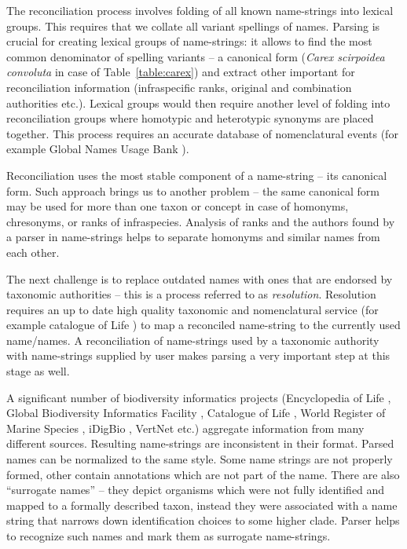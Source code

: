\documentclass{bmcart}
\begin{document}
The reconciliation process involves folding of all known name-strings into
lexical groups. This requires that we collate all variant spellings of names.
Parsing is crucial for creating lexical groups of name-strings: it allows to
find the most common denominator of spelling variants -- a canonical form
(\textit{Carex scirpoidea convoluta} in case of Table~\ref{table:carex}) and
extract other important for reconciliation  information (infraspecific ranks,
original and combination authorities etc.). Lexical groups would then require
another level of folding into reconciliation groups where homotypic and
heterotypic synonyms are placed together. This process requires an accurate
database of nomenclatural events (for example Global Names Usage Bank
\cite{Pyle2003}).

Reconciliation uses the most stable component of a name-string -- its canonical
form. Such approach brings us to another problem -- the same canonical form may
be used for more than one taxon or concept in case of homonyms, chresonyms, or
ranks of infraspecies. Analysis of ranks and the authors found by a
parser in name-strings helps to separate homonyms and similar names from each
other.

The next challenge is to replace outdated names with ones that are endorsed by
taxonomic authorities -- this is a process referred to as \textit{resolution}.
Resolution requires an up to date high quality taxonomic and nomenclatural
service (for example catalogue of Life \cite{col}) to map a reconciled
name-string to the currently used name/names. A reconciliation of name-strings
used by a taxonomic authority with name-strings supplied by user makes parsing
a very important step at this stage as well.

A significant number of biodiversity informatics projects (Encyclopedia of Life
\cite{eol}, Global Biodiversity Informatics Facility \cite{gbif}, Catalogue of
Life \cite{col}, World Register of Marine Species \cite{worms}, iDigBio
\cite{idigbio}, VertNet \cite{vertnet} etc.) aggregate information from many
different sources.  Resulting name-strings are inconsistent in their format.
Parsed names can be normalized to the same style. Some name strings are not
properly formed, other contain annotations which are not part of the name.
There are also “surrogate names” -- they depict organisms which were not fully
identified and mapped to a formally described taxon, instead they were
associated with a name string that narrows down identification choices to some
higher clade. Parser helps to recognize such names and mark them as surrogate
name-strings.
\end{document}

